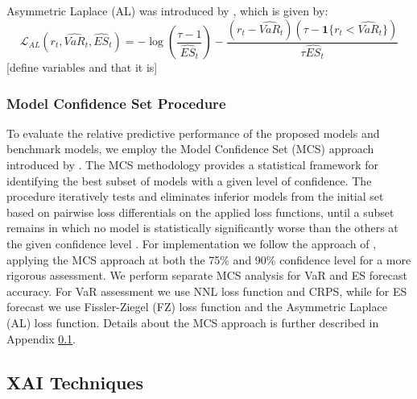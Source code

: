 Asymmetric Laplace (AL) was introduced by \textcite{Taylor2017}, which is given by:
\begin{equation}
\mathcal{L}_{AL}(r_t, \widehat{VaR}_t, \widehat{ES}_t) = 
- \log \left( \frac{\tau - 1}{\widehat{ES}_t} \right) 
- \frac{(r_t - \widehat{VaR}_t)(\tau - \mathbf{1}\{r_t < \widehat{VaR}_t\})}{\tau \widehat{ES}_t}
\end{equation}
[define variables and that it is] \\

\subsubsection{Model Confidence Set Procedure} 
\label{sec:model_confidence_set_procedure}
To evaluate the relative predictive performance of the proposed models and benchmark models, we employ the Model Confidence Set (MCS) approach introduced by \textcite{hansen2011mcs}. The MCS methodology provides a statistical framework for identifying the best subset of models with a given level of confidence. 
The procedure iteratively tests and eliminates inferior models from the initial set based on pairwise loss differentials on the applied loss functions, until a subset remains in which no model is statistically significantly worse than the others at the given confidence level \parencite{hansen2011mcs}. For implementation we follow the approach of \textcite{marchese2020mcs}, applying the MCS approach at both the 75\% and 90\% confidence level for a more rigorous assessment. We perform separate MCS analysis for VaR and ES forecast accuracy. For VaR assessment we use NNL loss function and CRPS, while for ES forecast we use Fissler-Ziegel (FZ) loss function and the Asymmetric Laplace (AL) loss function. Details about the MCS approach is further described in Appendix \ref{}.

\subsection{XAI Techniques}
